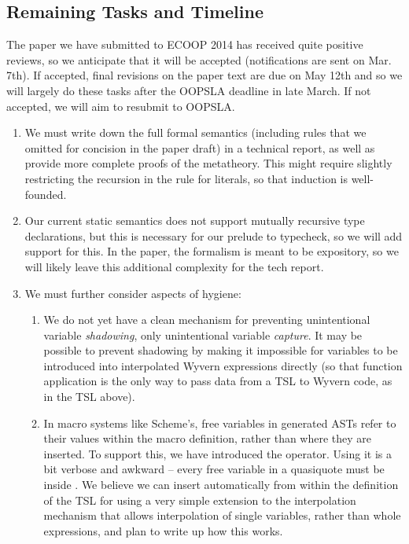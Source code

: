 {\subsection{Remaining Tasks and Timeline}
The paper we have submitted to ECOOP 2014 has received quite positive reviews, so we anticipate that it will be accepted (notifications are sent on Mar. 7th). If accepted, final revisions on the paper text are due on May 12th and so we will largely do these tasks after the OOPSLA deadline in late March. If not accepted, we will aim to resubmit to OOPSLA.
\begin{enumerate}
\item We must write down the full formal semantics (including rules that we omitted for concision in the paper draft) in a technical report, as well as provide more complete proofs of the metatheory. This might require slightly restricting the recursion in the rule for literals, so that induction is well-founded.
\item Our current static semantics does not support mutually recursive type declarations, but this is necessary for our prelude to typecheck, so we will add support for this. In the paper, the formalism is meant to be expository, so we will likely leave this additional complexity for the tech report.
\item We must further consider aspects of hygiene:
\begin{enumerate}
\item We do not yet have a clean mechanism for preventing unintentional variable \emph{shadowing}, only unintentional variable \emph{capture}. It may be possible to prevent shadowing by making it impossible for variables to be introduced into interpolated Wyvern expressions directly (so that function application is the only way to pass data from a TSL to Wyvern code, as in the  TSL above).
\item In macro systems like Scheme's, free variables in generated ASTs refer to their values within the macro definition, rather than where they are inserted. To support this, we have introduced the  operator. Using it is a bit verbose and awkward -- every free variable in a quasiquote must be inside . We believe we can insert  automatically from within the definition of the TSL for  using a very simple extension to the interpolation mechanism that allows interpolation of single variables, rather than whole expressions, and plan to write up how this works.

\end{enumerate}
\end{enumerate}}
